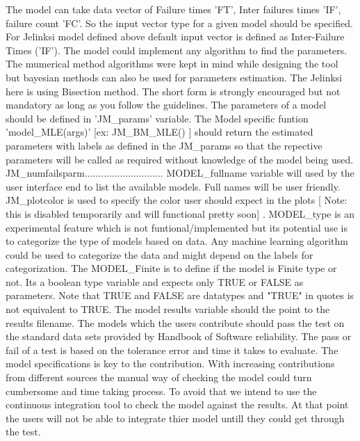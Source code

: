 \documentclass[journal]{IEEEtran}
\begin{document}
The model can take data vector of Failure times 'FT', Inter failures times 'IF', failure count 'FC'. So the input vector type for a given model should be specified. For Jelinksi model defined above default input vector is defined as Inter-Failure Times ('IF'). The model could implement any algorithm to find the parameters. The mumerical method algorithms were kept in mind while designing the tool but bayesian methods can also be used for parameters estimation. The Jelinksi here is using Bisection method. The short form is strongly encouraged but not mandatory as long as you follow the guidelines. The parameters of a model should be defined in 'JM_params' variable. The Model specific funtion '{model}_MLE({args})' [ex: JM_BM_MLE() ] should return the estimated parameters with labels as defined in the JM_params so that the repective parameters will be called as required without knowledge of the model being used. JM_numfailsparm............................. {MODEL}_fullname variable will used by the user interface end to list the available models. Full names will be user friendly. JM_plotcolor is used to specify the color user should expect in the plots [ Note: this is disabled temporarily and will functional pretty soon] . {MODEL}_type is an experimental feature which is not funtional/implemented but its potential use is to categorize the type of models based on data. Any machine learning algorithm could be used to categorize the data and might depend on the labels for categorization. The {MODEL}_Finite is to define if the model is Finite type or not. Its a boolean type variable and expects only TRUE or FALSE as parameters. Note that TRUE and FALSE are datatypes and "TRUE" in quotes is not equivalent to TRUE.  The model results variable should the point to the results filename. The models which the users contribute should pass the test on the standard data sets provided by Handbook of Software reliability. The pass or fail of a test is based on the tolerance error and time it takes to evaluate. The model specifications is key to the contribution. With increasing contributions from different sources the manual way of checking the model could turn cumbersome and time taking process. To avoid that we intend to use the continuous integration tool to check the model against the results. At that point the users will not be able to integrate thier model untill they could get through the test.  
\end{document}
